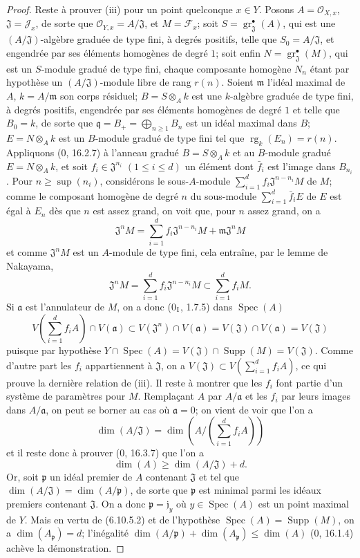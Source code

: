 \begin{proof}
Reste à prouver (iii) pour un point quelconque $x\in Y$. Posons
$A=\mathcal O_{X,x}$, $\mathfrak J=\mathcal J_x$, de sorte que
$\mathcal O_{Y,x}=A/\mathfrak J$, et $M=\mathcal F_x$; soit
$S=\operatorname{gr}_{\mathfrak J}^{\bullet}(A)$, qui est une
$(A/\mathfrak J)$-algèbre graduée de type fini, à degrés positifs, telle
que $S_0=A/\mathfrak J$, et engendrée par ses éléments homogènes de degré
$1$; soit enfin
$N=\operatorname{gr}_{\mathfrak J}^{\bullet}(M)$, qui est un $S$-module
gradué de type fini, chaque composante homogène $N_n$ étant par hypothèse
un $(A/\mathfrak J)$-module libre de rang $r(n)$. Soient $\mathfrak m$
l'idéal maximal de $A$, $k=A/\mathfrak m$ son corps résiduel;
$B=S\otimes_A k$ est une $k$-algèbre graduée de type fini, à degrés
positifs, engendrée par ses éléments homogènes de degré $1$ et telle que
$B_0=k$, de sorte que $\mathfrak q=B_+=\bigoplus_{n\geq1}B_n$ est un idéal
maximal dans $B$; $E=N\otimes_A k$ est un $B$-module gradué de type fini
tel que $\operatorname{rg}_k(E_n)=r(n)$. Appliquons (0, 16.2.7) à l'anneau
gradué $B=S\otimes_A k$ et au $B$-module gradué $E=N\otimes_A k$, et soit
$f_i\in\mathfrak J^{n_i}$ $(1\leq i\leq d)$ un élément dont $\bar f_i$ est
l'image dans $B_{n_i}$. Pour $n\geq\sup(n_i)$, considérons le sous-$A$-module
$\sum_{i=1}^{d}f_i\mathfrak J^{n-n_i}M$ de $M$; comme le composant homogène
de degré $n$ du sous-module $\sum_{i=1}^{d}\bar f_iE$ de $E$ est égal à
$E_n$ dès que $n$ est assez grand, on voit que, pour $n$ assez grand, on a
\[
\mathfrak J^nM=\sum_{i=1}^{d}f_i\mathfrak J^{n-n_i}M+
\mathfrak m\mathfrak J^nM
\]
et comme $\mathfrak J^nM$ est un $A$-module de type fini, cela entraîne,
par le lemme de Nakayama,
\[
\mathfrak J^nM=\sum_{i=1}^{d}f_i\mathfrak J^{n-n_i}M
\subset\sum_{i=1}^{d}f_iM.
\]
Si $\mathfrak a$ est l'annulateur de $M$, on a donc (0$_{\rm I}$, 1.7.5)
dans $\operatorname{Spec}(A)$
\[
V\left(\sum_{i=1}^{d}f_iA\right)\cap V(\mathfrak a)
\subset V(\mathfrak J^n)\cap V(\mathfrak a)
=V(\mathfrak J)\cap V(\mathfrak a)=V(\mathfrak J)
\]
puisque par hypothèse
$Y\cap\operatorname{Spec}(A)=V(\mathfrak J)\cap\operatorname{Supp}(M)
=V(\mathfrak J)$. Comme d'autre part les $f_i$ appartiennent à
$\mathfrak J$, on a
$V(\mathfrak J)\subset V(\sum_{i=1}^{d}f_iA)$, ce qui prouve la dernière
relation de (iii). Il reste à montrer que les $f_i$ font partie d'un système
de paramètres pour $M$. Remplaçant $A$ par $A/\mathfrak a$ et les $f_i$ par
leurs images dans $A/\mathfrak a$, on peut se borner au cas où
$\mathfrak a=0$; on vient de voir que l'on a
\[
\dim(A/\mathfrak J)=
\dim\left(A/\left(\sum_{i=1}^{d}f_iA\right)\right)
\]
et il reste donc à prouver (0, 16.3.7) que l'on a
\[
\dim(A)\geq\dim(A/\mathfrak J)+d.
\]
Or, soit $\mathfrak p$ un idéal premier de $A$ contenant $\mathfrak J$ et
tel que $\dim(A/\mathfrak J)=\dim(A/\mathfrak p)$, de sorte que
$\mathfrak p$ est minimal parmi les idéaux premiers contenant
$\mathfrak J$. On a donc $\mathfrak p=\mathfrak j_y$ où
$y\in\operatorname{Spec}(A)$ est un point maximal de $Y$. Mais en vertu de
(6.10.5.2) et de l'hypothèse
$\operatorname{Spec}(A)=\operatorname{Supp}(M)$, on a
$\dim(A_{\mathfrak p})=d$; l'inégalité
$\dim(A/\mathfrak p)+\dim(A_{\mathfrak p})\leq\dim(A)$ (0, 16.1.4)
achève la démonstration.
\end{proof}

